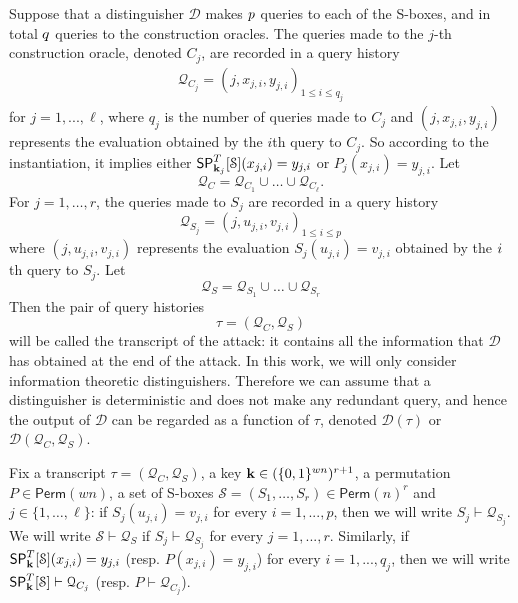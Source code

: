 \documentclass[journal=tosc,final,nohyperref]{iacrtrans}
\begin{document}
Suppose that a distinguisher $\mathcal{D}$ makes $\mathnormal{p}$ queries to each of the S-boxes, and in total $\mathnormal{q}$ queries to the construction oracles. The queries made to the $j$-th construction oracle, denoted $C_j$, are recorded in a query history
%
\begin{align}
\mathcal{Q}_{C_j} = (j,x_{j,i},y_{j,i})_{1 \leq i \leq q_j}
\label{eq:defn-QC}
\end{align}
%
for $j=1,...,\ell$, where $q_j$ is the number of queries made to $C_j$ and $(j,x_{j,i},y_{j,i})$ represents the evaluation obtained by the $i$th query to $C_j$. So according to the instantiation, it implies either $\mathsf{SP}_{\mathbf{k}_j}^T[\mathcal{S}](x_{j,i}) = y_{j,i}$  or ${P}_j(x_{j,i}) = y_{j,i}$. Let
%
$$\mathcal{Q}_{C}=\mathcal{Q}_{C_1}\cup\ldots\cup\mathcal{Q}_{C_\ell}.$$
%
For $j = 1,\ldots,r$, the queries made to $S_j$ are recorded in a query history
%
$$
\mathcal{Q}_{S_j} = (j, u_{j,i}, v_{j,i})_{1 \leq i \leq p}
$$
%
where $(j, u_{j,i}, v_{j,i})$  represents the evaluation $S_j(u_{j,i}) = v_{j,i}$ obtained by the $\mathnormal{i}$th query to $S_j$. Let
%
$$
\mathcal{Q}_{S}=\mathcal{Q}_{S_1} \cup \ldots \cup \mathcal{Q}_{S_r}
$$
%
Then the pair of query histories
%
$$
\tau = (\mathcal{Q}_{C}, \mathcal{Q}_{S})
$$
%
will be called the transcript of the attack: it contains all the information that $\mathcal{D}$ has obtained at the end of the attack. In this work, we will only consider
information theoretic distinguishers. Therefore we can assume that a distinguisher is deterministic and does not make any redundant query, and hence the output of  $\mathcal{D}$  can be regarded as a function of $\tau$, denoted $\mathcal{D}(\tau)$ or $\mathcal{D}(\mathcal{Q}_C, \mathcal{Q}_S)$.





Fix a transcript $\tau = (\mathcal{Q}_C,\mathcal{Q}_S)$, a key $\mathbf{k} \in(\{0,1\}^{wn})^{r+1}$, a permutation ${P} \in {\mathsf{Perm}}(wn)$,  a set of S-boxes $\mathcal{S}=(S_1, \ldots  ,S_r) \in \mathsf{Perm}(n)^r $ and $j \in \{1, \ldots, \ell \}$: if $S_j(u_{j,i})=v_{j,i}$ for every $i = 1, . . . , p$, then we will write $S_j\vdash\mathcal{Q}_{S_j}$. We will write $\mathcal{S}\vdash\mathcal{Q}_S$ if $S_j\vdash\mathcal{Q}_{S_j}$ for every $j = 1, . . . , r$. Similarly, if
$\mathsf{SP}_{\mathbf{k}}^T[\mathcal{S}](x_{j,i}) = y_{j,i}$ (resp. ${P}(x_{j,i}) = y_{j,i}$) for every $i = 1, . . . , q_j$, then we will write $\mathsf{SP}_{\mathbf{k}}^T[\mathcal{S}]\vdash\mathcal{Q}_{C_j}$ (resp. ${P}\vdash\mathcal{Q}_{C_j}$).
\end{document}
